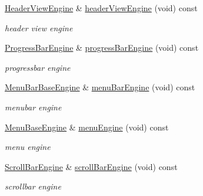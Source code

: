 \begin{DoxyCompactItemize}
\mbox{\label{class_animations_a11c6aad601e6462d6989b6bfd3f4f739}} 
\hyperlink{class_header_view_engine}{Header\+View\+Engine} \& \hyperlink{class_animations_a11c6aad601e6462d6989b6bfd3f4f739}{header\+View\+Engine} (void) const
\begin{DoxyCompactList}\small\item\em header view engine \end{DoxyCompactList}\item 
\mbox{\label{class_animations_a17a5992bca24c47cf03ba54ac3b67aac}} 
\hyperlink{class_progress_bar_engine}{Progress\+Bar\+Engine} \& \hyperlink{class_animations_a17a5992bca24c47cf03ba54ac3b67aac}{progress\+Bar\+Engine} (void) const
\begin{DoxyCompactList}\small\item\em progressbar engine \end{DoxyCompactList}\item 
\mbox{\label{class_animations_af03bbc0bdfaa4c4d75d886f1ad1022ee}} 
\hyperlink{class_menu_bar_base_engine}{Menu\+Bar\+Base\+Engine} \& \hyperlink{class_animations_af03bbc0bdfaa4c4d75d886f1ad1022ee}{menu\+Bar\+Engine} (void) const
\begin{DoxyCompactList}\small\item\em menubar engine \end{DoxyCompactList}\item 
\mbox{\label{class_animations_a20e6bd4c82d8e7da2bf9f873f8d31b38}} 
\hyperlink{class_menu_base_engine}{Menu\+Base\+Engine} \& \hyperlink{class_animations_a20e6bd4c82d8e7da2bf9f873f8d31b38}{menu\+Engine} (void) const
\begin{DoxyCompactList}\small\item\em menu engine \end{DoxyCompactList}\item 
\mbox{\label{class_animations_a6ed7b9bf87725a8ed1361bc3531baebb}} 
\hyperlink{class_scroll_bar_engine}{Scroll\+Bar\+Engine} \& \hyperlink{class_animations_a6ed7b9bf87725a8ed1361bc3531baebb}{scroll\+Bar\+Engine} (void) const
\begin{DoxyCompactList}\small\item\em scrollbar engine \end{DoxyCompactList}\item 

\end{DoxyCompactItemize}
